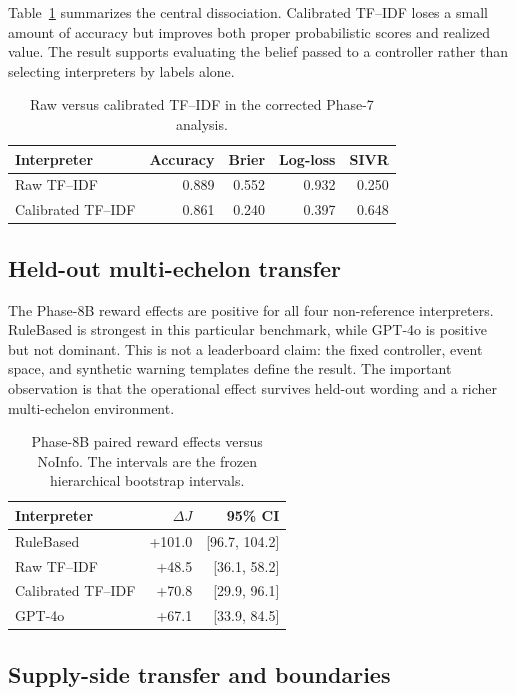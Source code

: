 \documentclass[10pt]{article}
\begin{document}
Table~\ref{tab:calibration} summarizes the central dissociation. Calibrated TF--IDF loses a small amount of accuracy but improves both proper probabilistic scores and realized value. The result supports evaluating the belief passed to a controller rather than selecting interpreters by labels alone.

\begin{table}[t]
\caption{Raw versus calibrated TF--IDF in the corrected Phase-7 analysis.}
\label{tab:calibration}
\centering
\small
\begin{tabular}{lrrrr}
\toprule
Interpreter & Accuracy & Brier & Log-loss & SIVR \\
\midrule
Raw TF--IDF & 0.889 & 0.552 & 0.932 & 0.250 \\
Calibrated TF--IDF & 0.861 & 0.240 & 0.397 & 0.648 \\
\bottomrule
\end{tabular}
\end{table}

\subsection{Held-out multi-echelon transfer}

The Phase-8B reward effects are positive for all four non-reference interpreters. RuleBased is strongest in this particular benchmark, while GPT-4o is positive but not dominant. This is not a leaderboard claim: the fixed controller, event space, and synthetic warning templates define the result. The important observation is that the operational effect survives held-out wording and a richer multi-echelon environment.

\begin{table}[t]
\caption{Phase-8B paired reward effects versus NoInfo. The intervals are the frozen hierarchical bootstrap intervals.}
\label{tab:phase8b}
\centering
\small
\begin{tabular}{lrr}
\toprule
Interpreter & $\Delta J$ & 95\% CI \\
\midrule
RuleBased & +101.0 & [96.7, 104.2] \\
Raw TF--IDF & +48.5 & [36.1, 58.2] \\
Calibrated TF--IDF & +70.8 & [29.9, 96.1] \\
GPT-4o & +67.1 & [33.9, 84.5] \\
\bottomrule
\end{tabular}
\end{table}

\subsection{Supply-side transfer and boundaries}
\end{document}
